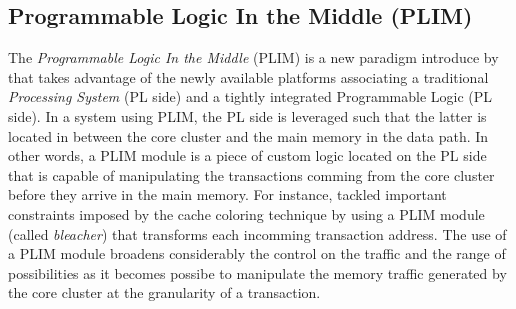     \subsection{Programmable Logic In the Middle (PLIM)}
        The \emph{Programmable Logic In the Middle} (PLIM) is a new paradigm introduce by \cite{PLIM20} that takes advantage of the newly available platforms associating a traditional \emph{Processing System} (PL side) and a tightly integrated Programmable Logic (PL side).
        In a system using PLIM, the PL side is leveraged such that the latter is located in between the core cluster and the main memory in the data path.
        In other words, a PLIM module is a piece of custom logic located on the PL side that is capable of manipulating the transactions comming from the core cluster before they arrive in the main memory.
        For instance, \cite{PLIM20} tackled important constraints imposed by the cache coloring technique by using a PLIM module (called \emph{bleacher}) that transforms each incomming transaction address.
        The use of a PLIM module broadens considerably the control on the traffic and the range of possibilities as it becomes possibe to manipulate the memory traffic generated by the core cluster at the granularity of a transaction.
